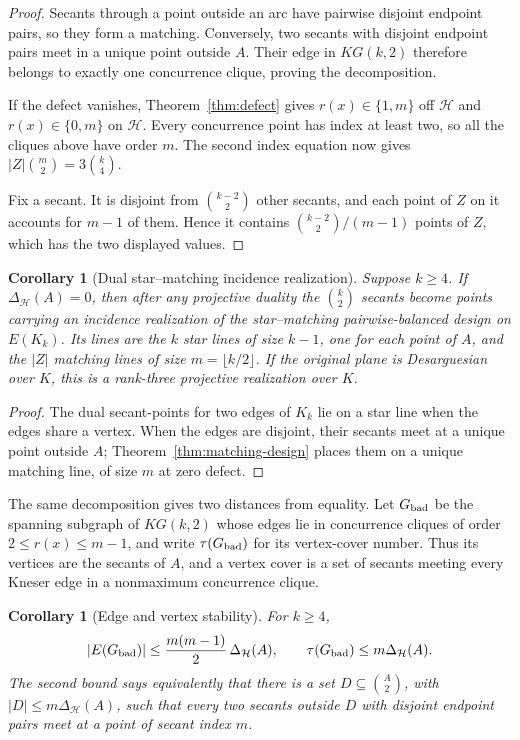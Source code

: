 \documentclass[11pt]{article}
\newtheorem{corollary}[theorem]{Corollary}
\theoremstyle{definition}
\theoremstyle{remark}
\newcommand{\cH}{\mathcal{H}}
\begin{document}
\begin{proof}
Secants through a point outside an arc have pairwise disjoint endpoint
pairs, so they form a matching.  Conversely, two secants with disjoint
endpoint pairs meet in a unique point outside $A$.  Their edge in
$KG(k,2)$ therefore belongs to exactly one concurrence clique, proving the
decomposition.

If the defect vanishes, Theorem~\ref{thm:defect} gives
$r(x)\in\{1,m\}$ off $\cH$ and $r(x)\in\{0,m\}$ on $\cH$.  Every
concurrence point has index at least two, so all the cliques above have
order $m$.  The second index equation now gives
$|Z|\binom m2=3\binom k4$.

Fix a secant.  It is disjoint from $\binom{k-2}{2}$ other secants, and each
point of $Z$ on it accounts for $m-1$ of them.  Hence it contains
$\binom{k-2}{2}/(m-1)$ points of $Z$, which has the two displayed values.
\end{proof}

\begin{corollary}[Dual star--matching incidence realization]
\label{cor:star-matching-realization}
Suppose \(k\ge4\).
If \(\Delta_{\cH}(A)=0\), then after any projective duality the
\(\binom{k}{2}\) secants become points carrying an incidence realization
of the star--matching pairwise-balanced design on \(E(K_k)\).
Its lines are the \(k\) star lines of size \(k-1\), one for each point of
\(A\), and the \(|Z|\) matching lines of size
\(m=\lfloor k/2\rfloor\).  If the original plane is Desarguesian over
\(K\), this is a rank-three projective realization over \(K\).
\end{corollary}

\begin{proof}
The dual secant-points for two edges of \(K_k\) lie on a star line when
the edges share a vertex.  When the edges are disjoint, their secants
meet at a unique point outside \(A\); Theorem~\ref{thm:matching-design}
places them on a unique matching line, of size \(m\) at zero defect.
\end{proof}

The same decomposition gives two distances from equality.  Let
\(G_{\rm bad}\) be the spanning subgraph of \(KG(k,2)\) whose edges lie
in concurrence cliques of order \(2\le r(x)\le m-1\), and write
\(\tau(G_{\rm bad})\) for its vertex-cover number.  Thus its vertices are
the secants of \(A\), and a vertex cover is a set of secants meeting
every Kneser edge in a nonmaximum concurrence clique.

\begin{corollary}[Edge and vertex stability]
\label{cor:bad-concurrence-stability}
For \(k\ge4\),
\[
 |E(G_{\rm bad})|
 \le \frac{m(m-1)}2\,\Delta_{\cH}(A),
 \qquad
 \tau(G_{\rm bad})\le m\Delta_{\cH}(A).
\]
The second bound says equivalently that there is a set
\(D\subseteq\binom A2\), with
\(|D|\le m\Delta_{\cH}(A)\), such that every two secants outside \(D\)
with disjoint endpoint pairs meet at a point of secant index \(m\).
\end{corollary}
\end{document}
